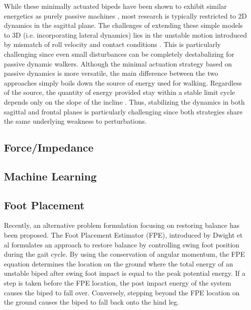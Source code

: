 While these minimally actuated bipeds have been shown to exhibit similar energetics as purely passive machines \cite{Asano:2004jp}, most research is typically restricted to 2D dynamics in the sagittal plane. The challenges of extending these simple models to 3D (i.e. incorporating lateral dynamics) lies in the unstable motion introduced by mismatch of roll velocity and contact conditions \cite{Kuo:1999tn}. This is particularly challenging since even small disturbances can be completely destabalizing for passive dynamic walkers. Although the minimal actuation strategy based on passive dynamics is more versatile, the main difference between the two approaches simply boils down the source of energy used for walking. Regardless of the source, the quantity of energy provided stay within a stable limit cycle depends only on the slope of the incline \cite{Goswami:1996gn}. Thus, stabilizing the dynamics in both sagittal and frontal planes is particularly challenging since both strategies share the same underlying weakness to perturbations. 


\subsection{Force/Impedance} %
\label{sub:related_force_impedance}
\Incomplete


\subsection{Machine Learning} %
\label{sub:related_machine_learning}
\Incomplete


\subsection{Foot Placement} %
\label{sub:related_foot_placement}
Recently, an alternative problem formulation focusing on restoring balance has been proposed. The Foot Placement Estimator (FPE), introduced by Dwight et al \cite{Wight:2008ii} formulates an approach to restore balance by controlling swing foot position during the gait cycle. By using the conservation of angular momentum, the FPE equation determines the location on the ground where the total energy of an unstable biped after swing foot impact is equal to the peak potential energy. If a step is taken before the FPE location, the post impact energy of the system causes the biped to fall over. Conversely, stepping beyond the FPE location on the ground causes the biped to fall back onto the hind leg.

